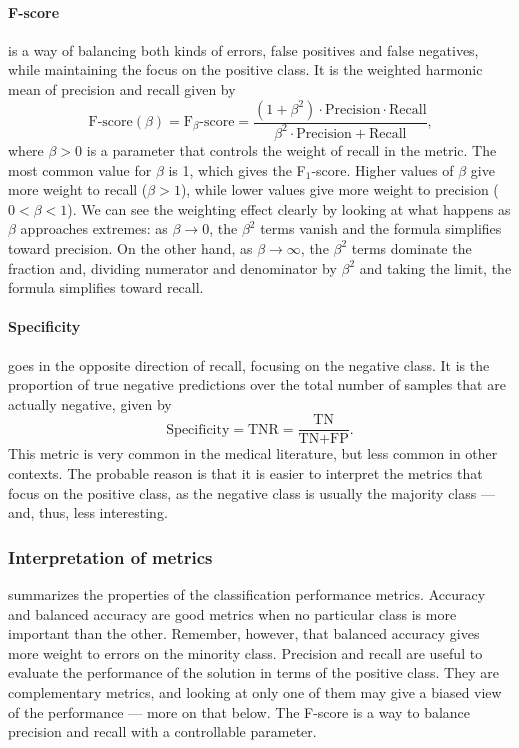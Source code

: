 \paragraph{F-score} is a way of balancing both kinds of errors, false positives and false
negatives, while maintaining the focus on the positive class. It is the weighted harmonic
mean of precision and recall given by
\begin{equation*}
  \text{F-score}(\beta) = \text{F}_\beta\text{-score} =
    \frac%
      {(1 + \beta^2) \cdot \text{Precision} \cdot \text{Recall}}
      {\beta^2 \cdot \text{Precision} + \text{Recall}}\text{,}
\end{equation*}
where $\beta > 0$ is a parameter that controls the weight of recall in the metric.
The most common value for $\beta$ is 1, which gives the F$_1$-score.  Higher values of
$\beta$ give more weight to recall ($\beta > 1$), while lower values give more weight
to precision ($0 < \beta < 1$).
We can see the weighting effect clearly by looking at what happens as $\beta$ approaches
extremes: as $\beta \to 0$, the $\beta^2$ terms vanish and the formula simplifies toward
precision.  On the other hand, as $\beta \to \infty$, the $\beta^2$ terms dominate the
fraction and, dividing numerator and denominator by $\beta^2$ and taking the limit, the
formula simplifies toward recall.

\paragraph{Specificity} goes in the opposite direction of recall, focusing on the negative
class.  It is the proportion of true negative predictions over the total
number of samples that are actually negative, given by
\begin{equation*}
  \text{Specificity} = \text{TNR} = \frac{\text{TN}}{\text{TN} + \text{FP}}\text{.}
\end{equation*}
This metric is very common in the medical literature, but less common in other contexts.
The probable reason is that it is easier to interpret the metrics that focus on the
positive class, as the negative class is usually the majority class --- and, thus, less
interesting.

\subsubsection{Interpretation of metrics}

 summarizes the properties of the classification
performance metrics.  Accuracy and balanced accuracy are good metrics when no particular
class is more important than the other.  Remember, however, that balanced accuracy gives
more weight to errors on the minority class.  Precision and recall are useful to evaluate
the performance of the solution in terms of the positive class.  They are complementary metrics,
and looking at only one of them may give a biased view of the performance --- more on that
below.  The F-score is a way to balance precision and recall with a controllable parameter.

